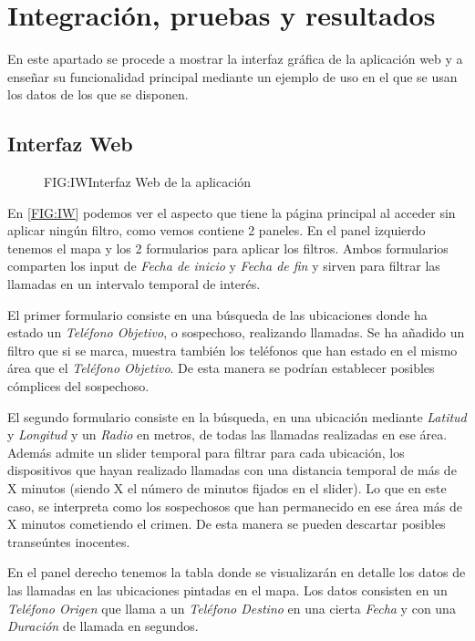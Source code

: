 \chapter{Integración, pruebas y resultados\label{CAP:IPR}}
  En este apartado se procede a mostrar la interfaz gráfica de la aplicación web y a enseñar su funcionalidad principal mediante un ejemplo de uso en el que se usan los datos de los que se disponen.
  
  \section{Interfaz Web}
    
    \begin{figure}[Interfaz Web de la aplicación]{FIG:IW}{Interfaz Web de la aplicación}
    \end{figure}
    
    En \ref{FIG:IW} podemos ver el aspecto que tiene la página principal al acceder sin aplicar ningún filtro, como vemos contiene 2 paneles. 
    En el panel izquierdo tenemos el mapa y los 2 formularios para aplicar los filtros. Ambos formularios comparten los input de \textit{Fecha de inicio} y \textit{Fecha de fin} y sirven para filtrar las llamadas en un intervalo temporal de interés.
    
    El primer formulario consiste en una búsqueda de las ubicaciones donde ha estado un \textit{Teléfono Objetivo}, o sospechoso, realizando llamadas. 
    Se ha añadido un filtro que si se marca, muestra también los teléfonos que han estado en el mismo área que el \textit{Teléfono Objetivo}. De esta manera se podrían establecer posibles cómplices del sospechoso.
  
    El segundo formulario consiste en la búsqueda, en una ubicación mediante \textit{Latitud} y \textit{Longitud} y un \textit{Radio} en metros, de todas las llamadas realizadas en ese área.
    Además admite un slider temporal para filtrar para cada ubicación, los dispositivos que hayan realizado llamadas con una distancia temporal de más de X minutos (siendo X el número de minutos fijados en el slider). Lo que en este caso, se interpreta como los sospechosos que han permanecido en ese área más de X minutos cometiendo el crimen. De esta manera se pueden descartar posibles transeúntes inocentes.
    
    En el panel derecho tenemos la tabla donde se visualizarán en detalle los datos de las llamadas en las ubicaciones pintadas en el mapa. Los datos consisten en un \textit{Teléfono Origen} que llama a un \textit{Teléfono Destino} en una cierta \textit{Fecha} y con una \textit{Duración} de llamada en segundos.
    
